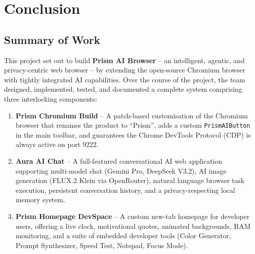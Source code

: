 \chapter{Conclusion}

\section{Summary of Work}
This project set out to build \textbf{Prism AI Browser} -- an intelligent, agentic, and privacy-centric web browser -- by extending the open-source Chromium browser with tightly integrated AI capabilities. Over the course of the project, the team designed, implemented, tested, and documented a complete system comprising three interlocking components:

\begin{enumerate}[leftmargin=*]
    \item \textbf{Prism Chromium Build} -- A patch-based customisation of the Chromium browser that renames the product to ``Prism'', adds a custom \texttt{PrismAIButton} in the main toolbar, and guarantees the Chrome DevTools Protocol (CDP) is always active on port 9222.
    \item \textbf{Aura AI Chat} -- A full-featured conversational AI web application supporting multi-model chat (Gemini Pro, DeepSeek V3.2), AI image generation (FLUX.2 Klein via OpenRouter), natural language browser task execution, persistent conversation history, and a privacy-respecting local memory system.
    \item \textbf{Prism Homepage DevSpace} -- A custom new-tab homepage for developer users, offering a live clock, motivational quotes, animated backgrounds, RAM monitoring, and a suite of embedded developer tools (Color Generator, Prompt Synthesizer, Speed Test, Notepad, Focus Mode).
\end{enumerate}

